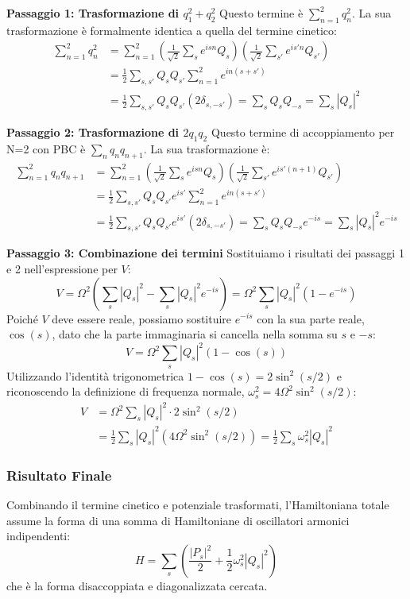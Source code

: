 \textbf{Passaggio 1: Trasformazione di $q_1^2 + q_2^2$}
Questo termine è $\sum_{n=1}^2 q_n^2$. La sua trasformazione è formalmente identica a quella del termine cinetico:
\begin{align*}
    \sum_{n=1}^2 q_n^2 &= \sum_{n=1}^2 \left( \frac{1}{\sqrt{2}} \sum_s e^{isn} Q_s \right) \left( \frac{1}{\sqrt{2}} \sum_{s'} e^{is'n} Q_{s'} \right) \\
    &= \frac{1}{2} \sum_{s,s'} Q_s Q_{s'} \sum_{n=1}^2 e^{in(s+s')} \\
    &= \frac{1}{2} \sum_{s,s'} Q_s Q_{s'} (2\delta_{s,-s'}) = \sum_s Q_s Q_{-s} = \sum_s |Q_s|^2
\end{align*}

\textbf{Passaggio 2: Trasformazione di $2q_1q_2$}
Questo termine di accoppiamento per N=2 con PBC è $\sum_n q_n q_{n+1}$. La sua trasformazione è:
\begin{align*}
    \sum_{n=1}^2 q_n q_{n+1} &= \sum_{n=1}^2 \left( \frac{1}{\sqrt{2}} \sum_s e^{isn} Q_s \right) \left( \frac{1}{\sqrt{2}} \sum_{s'} e^{is'(n+1)} Q_{s'} \right) \\
    &= \frac{1}{2} \sum_{s,s'} Q_s Q_{s'} e^{is'} \sum_{n=1}^2 e^{in(s+s')} \\
    &= \frac{1}{2} \sum_{s,s'} Q_s Q_{s'} e^{is'} (2\delta_{s,-s'}) = \sum_s Q_s Q_{-s} e^{-is} = \sum_s |Q_s|^2 e^{-is}
\end{align*}

\textbf{Passaggio 3: Combinazione dei termini}
Sostituiamo i risultati dei passaggi 1 e 2 nell'espressione per $V$:
\begin{equation*}
    V = \Omega^2 \left( \sum_s |Q_s|^2 - \sum_s |Q_s|^2 e^{-is} \right) = \Omega^2 \sum_s |Q_s|^2 (1 - e^{-is})
\end{equation*}
Poiché $V$ deve essere reale, possiamo sostituire $e^{-is}$ con la sua parte reale, $\cos(s)$, dato che la parte immaginaria si cancella nella somma su $s$ e $-s$:
\begin{equation*}
    V = \Omega^2 \sum_s |Q_s|^2 (1 - \cos(s))
\end{equation*}
Utilizzando l'identità trigonometrica $1-\cos(s) = 2\sin^2(s/2)$ e riconoscendo la definizione di frequenza normale, $\omega_s^2 = 4\Omega^2\sin^2(s/2)$:
\begin{align*}
    V &= \Omega^2 \sum_s |Q_s|^2 \cdot 2\sin^2(s/2) \\
      &= \frac{1}{2} \sum_s |Q_s|^2 \left( 4\Omega^2 \sin^2(s/2) \right) = \frac{1}{2} \sum_s \omega_s^2 |Q_s|^2
\end{align*}

\subsubsection{Risultato Finale}
Combinando il termine cinetico e potenziale trasformati, l'Hamiltoniana totale assume la forma di una somma di Hamiltoniane di oscillatori armonici indipendenti:
\begin{equation}
    H = \sum_s \left( \frac{|P_s|^2}{2} + \frac{1}{2}\omega_s^2 |Q_s|^2 \right)
\end{equation}
che è la forma disaccoppiata e diagonalizzata cercata.

